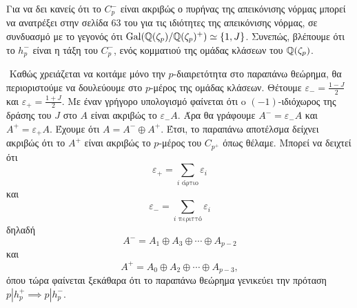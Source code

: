 \begin{figure}[H]
	\centering
\end{figure}

\noindent Για να δει κανείς ότι το $C_p^-$ είναι ακριβώς ο πυρήνας της απεικόνισης νόρμας μπορεί να ανατρέξει στην σελίδα 63 του \cite{Milne1} για τις ιδιότητες της απεικόνισης νόρμας, σε συνδυασμό με το γεγονός ότι $\operatorname{Gal}(\mathbb{Q}(\zeta_p)/\mathbb{Q}(\zeta_p)^+) \simeq \{1,J\}$. Συνεπώς, βλέπουμε ότι το $h_p^-$ είναι η τάξη του $C_p^-$, ενός κομματιού της ομάδας κλάσεων του $\mathbb{Q}(\zeta_p)$.

$ $\newline
Καθώς χρειάζεται να κοιτάμε μόνο την $p$-διαιρετότητα στο παραπάνω θεώρημα, θα περιοριστούμε να δουλεύουμε στο $p$-μέρος της ομάδας 
κλάσεων. Θέτουμε $\varepsilon_{-} = \frac{1-J}{2}$ και $\varepsilon_+ = \frac{1+J}2$. Με έναν γρήγορο υπολογισμό φαίνεται ότι 
o $(-1)$-ιδιόχωρος της δράσης του $J$ στο $A$ είναι ακριβώς το $\varepsilon_- A$. Άρα θα γράφουμε 
$A^- =\varepsilon_- A$ και $A^+ = \varepsilon_+ A$. Έχουμε ότι $A = A^- \oplus A^+$. Έτσι, το παραπάνω αποτέλσμα δείχνει 
ακριβώς ότι το $A^+$ είναι ακριβώς το $p$-μέρος του $C_{p^+}$ όπως θέλαμε. Μπορεί να δειχτεί ότι
$$\varepsilon_+ = \sum\limits_{i \text{ άρτιο}}\varepsilon_i$$ και  
$$\varepsilon_- = \sum\limits_{i \text{ περιττό}}\varepsilon_i$$ δηλαδή
$$A^- = A_1 \oplus A_3 \oplus\cdots \oplus A_{p-2}$$ και 
$$A^+ = A_0 \oplus A_2 \oplus\cdots \oplus A_{p-3},$$ όπου τώρα φαίνεται ξεκάθαρα ότι το παραπάνω θεώρημα γενικεύει την πρόταση $p|h^+_p \implies p|h_p^-$.


